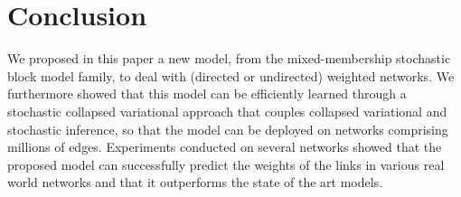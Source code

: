 \section{Conclusion}
\label{sec:concl}

We proposed in this paper a new model, from the mixed-membership stochastic block model family, to deal with (directed or undirected) weighted networks. We furthermore showed that this model can be efficiently learned through a stochastic collapsed variational approach that couples collapsed variational and stochastic inference, so that the model can be deployed on networks comprising millions of edges. Experiments conducted on several networks showed that the proposed model can successfully predict the weights of the links  in various real world networks and that it outperforms the state of the art models. 
